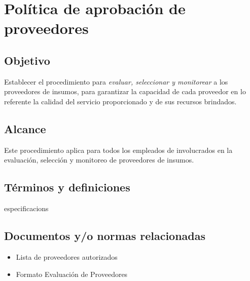 \thispagestyle{formato-PI}
\renewcommand{\MayorVer}{2}
\renewcommand{\MenorVer}{1}
\renewcommand{\Codigo}{PSA-1-PROG} %
\renewcommand{\FechaPub}{2023--01}
\renewcommand{\Titulo}{Política de aprobación de proveedores}

\section{\Titulo}


\subsection{Objetivo}

Establecer el procedimiento para \emph{evaluar, seleccionar y monitorear} a los proveedores de insumos, para garantizar la capacidad de cada proveedor en lo referente la calidad del servicio proporcionado y de sus recursos brindados.

\subsection{Alcance}

Este procedimiento aplica para todos los empleados de  involucrados en la evaluación, selección y monitoreo de proveedores de insumos.

\subsection{Términos y definiciones}
\begin{description}
    \glspl{especificacion}
\end{description}
\subsection{Documentos y/o normas relacionadas}

\begin{itemize}
    \item Lista de proveedores autorizados
    \item Formato Evaluación de Proveedores
\end{itemize}

